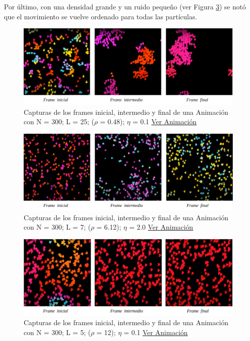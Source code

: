 \documentclass[12pt, a4paper]{report}
\begin{document}
Por último, con una densidad grande y un ruido pequeño (ver Figura \ref{fig:d_big_n_small}) se notó que el movimiento se vuelve ordenado para todas las partículas.
 
\begin{figure}[h]
\includegraphics[scale=0.4]{d_n_small.png}
\centering 
\caption{Capturas de los frames inicial, intermedio y final de una Animación con  N = 300; L = 25;	($\rho$ = 0.48); $\eta$ = 0.1 \href{https://www.youtube.com/watch?v=V2oRjjUPpmY}{\underline{Ver Animación}}} 
\label{fig:d_n_small}
\end{figure}


\begin{figure}[h]
\includegraphics[scale=0.4]{d_n_big.png}
\centering 
\caption{Capturas de los frames inicial, intermedio y final de una Animación con N = 300; L = 7; ($\rho$ = 6.12); $\eta$ = 2.0 \href{https://www.youtube.com/watch?v=t88TD__ushc}{\underline{Ver Animación}}} 
\label{fig:d_n_big}
\end{figure}

\pagebreak
\begin{figure}[h]
\includegraphics[scale=0.4]{d_big_n_small.png}
\centering 
\caption{Capturas de los frames inicial, intermedio y final de una Animación con N = 300; L = 5; ($\rho$ = 12); $\eta$ = 0.1  \href{https://www.youtube.com/watch?v=CnaNaZNd1MY}{\underline{Ver Animación}}} 
\label{fig:d_big_n_small}
\end{figure}
\end{document}
